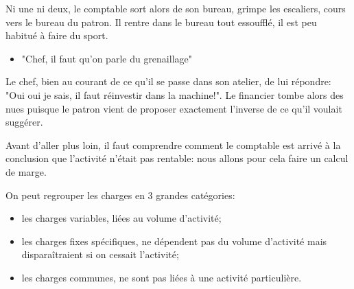 Ni une ni deux, le comptable sort alors de son bureau,
grimpe les escaliers, cours vers le bureau du patron. 
Il rentre dans le bureau tout essoufflé, il est peu habitué 
à faire du sport. 
\begin{itemize}
  \item "Chef, il faut qu'on parle du grenaillage"
\end{itemize}
Le chef, bien au courant de ce qu'il se passe dans son atelier, 
de lui répondre: "Oui oui je sais, il faut réinvestir dans la 
machine!".
Le financier tombe alors des nues puisque le patron vient de 
proposer exactement l'inverse de ce qu'il voulait suggérer.


Avant d'aller plus loin, il faut comprendre comment le 
comptable est arrivé à la conclusion que l'activité n'était pas 
rentable: nous allons pour cela faire un calcul de marge.

On peut regrouper les charges en 3 grandes catégories: 
\begin{itemize}
  \item les charges variables, liées au volume d'activité;
  \item les charges fixes spécifiques, ne dépendent pas du volume 
        d'activité mais disparaîtraient si on cessait l'activité;
  \item les charges communes, ne sont pas liées à une activité particulière.
\end{itemize}

